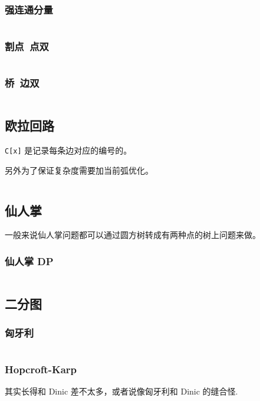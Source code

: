 \documentclass[a4paper, twoside]{article}
\begin{document}
\begin{multicols}{2}
				\subsubsection{强连通分量}
					\inputminted[highlightlines={15,18,21}]{cpp}{../src/graph/强连通分量.cpp}
				
				\subsubsection{割点~点双}
					\inputminted[highlightlines={17,19,40}]{cpp}{../src/graph/割点点双.cpp}

				\subsubsection{桥~边双}
					\inputminted[highlightlines={18,20,27}]{cpp}{../src/graph/边双.cpp}
			
			\subsection{欧拉回路}
				\texttt{C[x]} 是记录每条边对应的编号的。
				
				另外为了保证复杂度需要加当前弧优化。
				
				\inputminted{cpp}{../src/graph/欧拉回路.cpp}

			\subsection{仙人掌}
				一般来说仙人掌问题都可以通过圆方树转成有两种点的树上问题来做。

				\subsubsection{仙人掌 DP}
					\inputminted{cpp}{../src/graph/仙人掌DP.cpp}
			
			\subsection{二分图}
				\subsubsection[匈牙利 Hungary]{匈牙利}
					\inputminted{cpp}{../src/graph/hungary.cpp}

				\subsubsection[Hopcroft-Karp~二分图匹配]{Hopcroft-Karp}
					其实长得和 Dinic 差不太多，或者说像匈牙利和 Dinic 的缝合怪.
					\inputminted{cpp}{../src/graph/hopcroft-karp.cpp}


\end{multicols}
\end{document}
